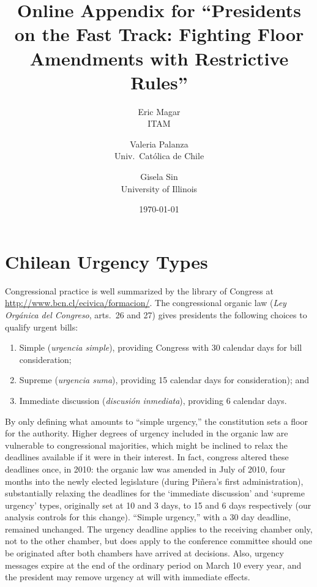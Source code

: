\documentclass[letter,12pt]{article}
\begin{document}
\title{Online Appendix for ``Presidents on the Fast Track: Fighting Floor Amendments with Restrictive Rules''}
\author{Eric Magar \\ ITAM \and
        Valeria Palanza \\ Univ.\ Cat\'olica de Chile \and  
        Gisela Sin \\ University of Illinois
}
\date{\today}
\maketitle

\tableofcontents

\doublespacing

\renewcommand\thefigure{A.\arabic{figure}} 
\renewcommand\thetable{A.\arabic{table}} 



\section{Chilean Urgency Types}

Congressional practice is well summarized by the library of Congress at \url{http://www.bcn.cl/ecivica/formacion/}. The congressional organic law (\emph{Ley Org\'anica del Congreso}, arts.\ 26 and 27) gives presidents the following choices to qualify urgent bills:

\begin{enumerate}
\item Simple (\emph{urgencia simple}), providing Congress with 30 calendar days for bill consideration;
\item Supreme (\emph{urgencia suma}), providing 15 calendar days for consideration); and
\item Immediate discussion (\emph{discusi\'on inmediata}), providing 6 calendar days.
\end{enumerate}

\noindent By only defining what amounts to ``simple urgency,'' the constitution sets a floor for the authority. Higher degrees of urgency included in the organic law are vulnerable to congressional majorities, which might be inclined to relax the deadlines available if it were in their interest. In fact, congress altered these deadlines once, in 2010: the organic law was amended in July of 2010, four months into the newly elected legislature (during Pi\~nera's first administration), substantially relaxing the deadlines for the `immediate discussion' and `supreme urgency' types, originally set at 10 and 3 days, to 15 and 6 days respectively (our analysis controls for this change). ``Simple urgency,'' with a 30 day deadline, remained unchanged. The urgency deadline applies to the receiving chamber only, not to the other chamber, but does apply to the conference committee should one be originated after both chambers have arrived at decisions. Also, urgency messages expire at the end of the ordinary period on March 10 every year, and the president may remove urgency at will with immediate effects.
\end{document}
